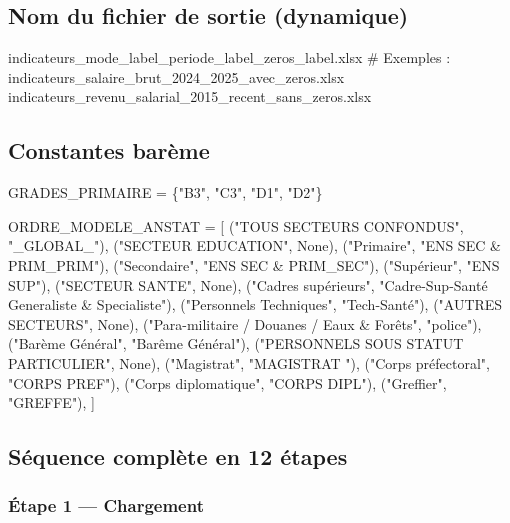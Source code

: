 \documentclass[12pt,a4paper,french]{report}
\begin{document}
\subsection{Nom du fichier de sortie (dynamique)}

\begin{codebox}[]
indicateurs\_{mode\_label}\_{periode\_label}\_{zeros\_label}.xlsx
# Exemples :
indicateurs\_salaire\_brut\_2024\_2025\_avec\_zeros.xlsx
indicateurs\_revenu\_salarial\_2015\_recent\_sans\_zeros.xlsx
\end{codebox}

\subsection{Constantes barème}

\begin{codebox}[]
GRADES\_PRIMAIRE = \{"B3", "C3", "D1", "D2"\}

ORDRE\_MODELE\_ANSTAT = [
    ("TOUS SECTEURS CONFONDUS",                       "\_GLOBAL\_"),
    ("SECTEUR EDUCATION",                             None),
    ("Primaire",                                      "ENS SEC \& PRIM\_PRIM"),
    ("Secondaire",                                    "ENS SEC \& PRIM\_SEC"),
    ("Supérieur",                                     "ENS SUP"),
    ("SECTEUR SANTE",                                 None),
    ("Cadres supérieurs",  "Cadre-Sup-Santé Generaliste \& Specialiste"),
    ("Personnels Techniques",                         "Tech-Santé"),
    ("AUTRES SECTEURS",                               None),
    ("Para-militaire / Douanes / Eaux \& Forêts",     "police"),
    ("Barème Général",                                "Barême Général"),
    ("PERSONNELS SOUS STATUT PARTICULIER",            None),
    ("Magistrat",                                     "MAGISTRAT "),
    ("Corps préfectoral",                             "CORPS PREF"),
    ("Corps diplomatique",                            "CORPS DIPL"),
    ("Greffier",                                      "GREFFE"),
]
\end{codebox}

\subsection{Séquence complète en 12 étapes}

\subsubsection{Étape 1 — Chargement}
\end{document}
